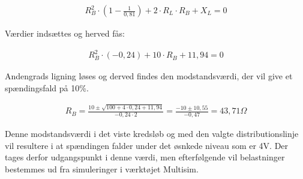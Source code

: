 \begin{align}
R_B^2\cdot (1-\frac{1}{0,81})+2\cdot R_L\cdot R_B+X_L=0
\end{align}

Værdier indsættes og herved fås:

\begin{align}
R_B^2\cdot (-0,24) +10\cdot R_B+11,94=0
\end{align}

Andengrads ligning løses og derved findes den modstandsværdi, der vil give et spændingsfald på 10\%.

\begin{align}
R_B=\frac{10\pm\sqrt{100+4\cdot 0,24+11,94}}{-0,24\cdot 2}=\frac{-10\pm 10,55}{-0,47}=43,71 \Omega
\end{align}

Denne modstandsværdi i det viste kredsløb og med den valgte distributionslinje vil resultere i at spændingen falder under det øsnkede niveau som er 4V. Der tages derfor udgangspunkt i denne værdi, men efterfølgende vil belastninger bestemmes ud fra simuleringer i værktøjet Multisim. 



